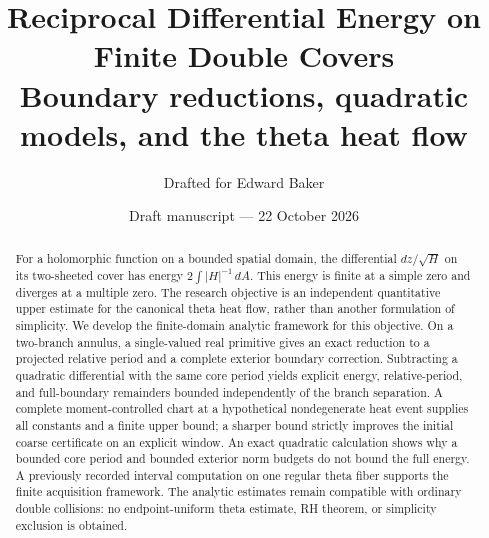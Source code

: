 \documentclass[11pt,letterpaper]{article}
\title{Reciprocal Differential Energy on Finite Double Covers\\
\large Boundary reductions, quadratic models, and the theta heat flow}
\author{Drafted for Edward Baker}
\date{Draft manuscript --- 22 October 2026}
\numberwithin{equation}{section}
\theoremstyle{definition}
\theoremstyle{remark}
\newcommand{\dd}{\,d}
\begin{document}
\maketitle
\begin{abstract}
For a holomorphic function on a bounded spatial domain, the differential
$dz/\sqrt H$ on its two-sheeted cover has energy $2\int |H|^{-1}\dd A$.
This energy is finite at a simple zero and diverges at a multiple zero.
The research objective is an independent quantitative upper estimate for
the canonical theta heat flow, rather than another formulation of
simplicity. We develop the finite-domain analytic framework for this
objective. On a two-branch annulus, a single-valued real primitive gives
an exact reduction to a projected relative period and a complete exterior
boundary correction. Subtracting a quadratic differential with the same
core period yields explicit energy, relative-period, and full-boundary
remainders bounded independently of the branch separation. A complete
moment-controlled chart at a hypothetical nondegenerate heat event supplies
all constants and a finite upper bound; a sharper bound strictly improves
the initial coarse certificate on an explicit window. An exact quadratic
calculation shows why a bounded core period and bounded exterior norm
budgets do not bound the full energy. A previously recorded interval
computation on one regular theta fiber supports the finite acquisition
framework. The analytic estimates remain compatible with ordinary double
collisions: no endpoint-uniform theta estimate, RH theorem, or simplicity
exclusion is obtained.
\end{abstract}
\tableofcontents








\appendix


\end{document}
